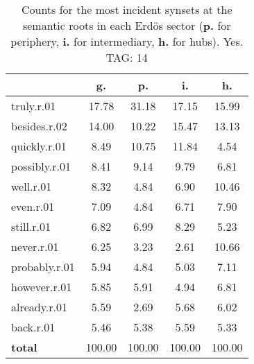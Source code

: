 \begin{table}[h!]
\begin{center}
\begin{tabular}{| l || c | c | c | c |}\hline
 & {\bf g.} & {\bf p.} & {\bf i.} & {\bf h.} \\\hline\hline
truly.r.01 & 17.78  & 31.18  & 17.15  & 15.99 \\\hline
besides.r.02 & 14.00  & 10.22  & 15.47  & 13.13 \\\hline
quickly.r.01 & 8.49  & 10.75  & 11.84  & 4.54 \\\hline
possibly.r.01 & 8.41  & 9.14  & 9.79  & 6.81 \\\hline
well.r.01 & 8.32  & 4.84  & 6.90  & 10.46 \\\hline
even.r.01 & 7.09  & 4.84  & 6.71  & 7.90 \\\hline
still.r.01 & 6.82  & 6.99  & 8.29  & 5.23 \\\hline
never.r.01 & 6.25  & 3.23  & 2.61  & 10.66 \\\hline
probably.r.01 & 5.94  & 4.84  & 5.03  & 7.11 \\\hline
however.r.01 & 5.85  & 5.91  & 4.94  & 6.81 \\\hline
already.r.01 & 5.59  & 2.69  & 5.68  & 6.02 \\\hline
back.r.01 & 5.46  & 5.38  & 5.59  & 5.33 \\\hline\hline
{{\bf total}} & 100.00  & 100.00  & 100.00  & 100.00 \\\hline
\end{tabular}
\caption{Counts for the most incident synsets at the semantic roots in each Erd\"os sector ({\bf p.} for periphery, {\bf i.} for intermediary, {\bf h.} for hubs). Yes. TAG: 14}
\end{center}
\end{table}